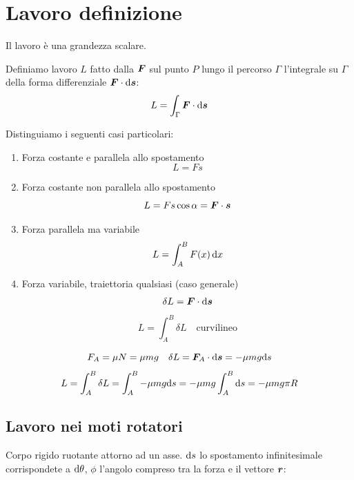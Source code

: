 \section{Lavoro definizione}
Il lavoro è una grandezza scalare.
\begin{Def}[lavoro]
Definiamo lavoro $L$ fatto dalla $\boldsymbol{F}$ sul punto $P$ lungo il percorso $\Gamma$ l'integrale su $\Gamma$ della forma differenziale $\boldsymbol{F}\cdot\mathrm{d}\boldsymbol{s}$:
\begin{equation}
L=\int_\Gamma\boldsymbol{F}\cdot\mathrm{d} \boldsymbol{s}
\end{equation}
\end{Def}
Distinguiamo i seguenti casi particolari:
\begin {enumerate}
\item[a)]  Forza costante e parallela allo spostamento
\begin{equation*}L=Fs\end{equation*}

\item[b)] Forza costante non parallela allo spostamento
\begin{equation*}L=Fs\cos\alpha=\boldsymbol{F} \cdot \boldsymbol{s}\end{equation*}

\item[c)] Forza parallela ma variabile
\begin{equation*}L=\int_A^B F(x)\,\mathrm{d} x\end{equation*}

\item[d)] Forza variabile, traiettoria qualsiasi (caso generale)
\begin{equation*}\delta L=\boldsymbol{F}\cdot\mathrm{d} \boldsymbol{s}\end{equation*}
\begin{equation*}{L=\int_A^B\delta L \quad \text{curvilineo}}\end{equation*}
\end{enumerate}
\begin{Es}
\begin{equation*}F_A=\mu N=\mu mg\quad \delta L=\boldsymbol{F}_A\cdot\mathrm{d} \boldsymbol{s}=-\mu mg\mathrm{d} s\end{equation*}
$$L=\int_A^B \delta L=\int_A^B -\mu mg\mathrm{d} s=-\mu mg\int_A^B\mathrm{d}
s=-\mu mg\pi R$$
\end{Es}
\subsection{Lavoro nei moti rotatori}
Corpo rigido ruotante attorno ad un asse. $\mathrm{d} s$ lo spostamento
infinitesimale corrispondete a $\mathrm{d} \theta$, $\phi$ l'angolo
compreso tra la forza e il vettore $\boldsymbol{r}$:

